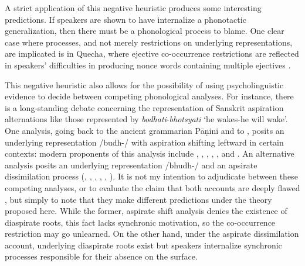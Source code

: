 A strict application of this negative heuristic produces some interesting predictions. If speakers are shown to have internalize a phonotactic generalization, then there must be a phonological process to blame. One clear case where processes, and not merely restrictions on underlying representations, are implicated is in Quecha, where ejective co-occurrence restrictions are reflected in speakers' difficulties in producing nonce words containing multiple ejectives \citep{GallagherInPress}. 

This negative heuristic also allows for the possibility of using psycholinguistic evidence to decide between competing phonological analyses. For instance, there is a long-standing debate concerning the representation of Sanskrit aspiration alternations like those represented by \emph{bodhati}-\emph{bhotsyati} `he wakes-he will wake'. One analysis, going back to the ancient grammarian Pāṇini \citep{Sag1974} and to \citet[\S141f.]{Whitney1889}, posits an underlying representation /budh-/ with aspiration shifting leftward in certain contexts: modern proponents of this analysis include \citet{Borowsky1983}, \citet[][59f.]{Hoenigswald1965}, \citet{Kaye1985}, \citet{Sag1974,Sag1976} \citet{Schindler1976}, \citet{Stemberger1980}, and \citet[][\S141f.]{Whitney1889}. An alternative analysis posits an underlying representation /bhudh-/ and an apsirate dissimilation process (\citealt{Anderson1970}, \citealt{Hoard1975}, \citealt[\S3.2]{Kiparsky1965}, \citealt{Phelps1973}, \citealt{Phelps1975b}, \citealt[109f.]{Zwicky1965}). It is not my intention to adjudicate between these competing analyses, or to evaluate the claim that both accounts are deeply flawed \citep{Janda1989}, but simply to note that they make different predictions under the theory proposed here. While the former, aspirate shift analysis denies the existence of diaspirate roots, this fact lacks synchronic motivation, so the co-occurrence restriction may go unlearned. On the other hand, under the aspirate dissimilation account, underlying diaspirate roots exist but speakers internalize synchronic processes responsible for their absence on the surface. 

